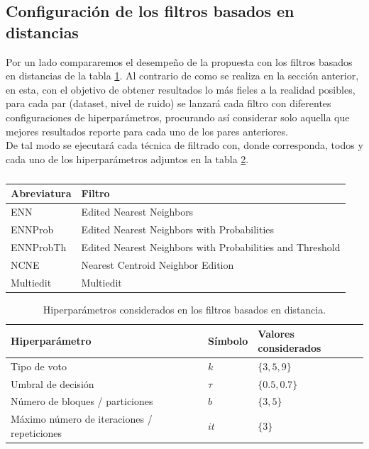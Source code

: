 \documentclass[print, color]{ugrTFG}
\begin{document}
    \subsection{Configuración de los filtros basados en distancias}
    Por un lado compararemos el desempeño de la propuesta con los filtros basados en distancias de la tabla \ref{tab:distance_filters}. Al contrario de como se realiza en la sección anterior, en esta, con el objetivo de obtener resultados lo más fieles a la realidad posibles, para cada par (dataset, nivel de ruido) se lanzará cada filtro con diferentes configuraciones de hiperparámetros, procurando así considerar solo aquella que mejores resultados reporte para cada uno de los pares anteriores.\\
    
    De tal modo se ejecutará cada técnica de filtrado con, donde corresponda, todos y cada uno de los hiperparámetros adjuntos en la tabla \ref{tab:hiperparametros_distancia}.\\
    
        
        \begin{table}[t]
            \centering
            \begin{tabular}{ll}
            \hline
            \textbf{Abreviatura} & \textbf{Filtro}                                           \\ \hline
            ENN                  & Edited Nearest Neighbors                                  \\
            ENNProb              & Edited Nearest Neighbors with Probabilities               \\
            ENNProbTh            & Edited Nearest Neighbors with Probabilities and Threshold \\
            NCNE                 & Nearest Centroid Neighbor Edition                         \\
            Multiedit            & Multiedit                                                 \\ \hline
            \end{tabular}
            \caption{}
            \label{tab:distance_filters}
        \end{table}
        
        \begin{table}[t]
            \centering
            \begin{tabular}{lll}
            \hline
            Hiperparámetro & Símbolo & Valores considerados \\
            \hline
            Tipo de voto & $k$ & $\{3,5,9\}$ \\
            Umbral de decisión & $\tau$ & $\{0.5,0.7\}$ \\
            Número de bloques / particiones & $b$ & $\{3,5\}$ \\
            Máximo número de iteraciones / repeticiones & $it$ & $\{3\}$ \\
            \hline
            \end{tabular}
            \caption{Hiperparámetros considerados en los filtros basados en distancia.}
            \label{tab:hiperparametros_distancia}
        \end{table}
    
\end{document}
